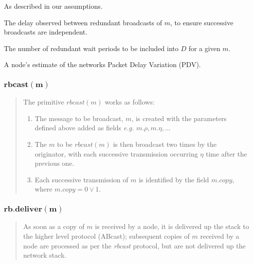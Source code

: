     \begin{description}[leftmargin=1cm, labelindent=1cm]
        \item[$\bm{x_{mx}}$ \textnormal{and}  $\bm{q}$ - ]    As described in our assumptions.
        
        \item[$\bm{\eta}$ - ]    The delay observed between redundant broadcasts of $m$, to ensure successive broadcasts are independent.  

        \item[$\bm{\rho}$ - ]    The number of redundant wait periods to be included into $D$ for a given $m$.        
        
        \item[$\bm{\omega}$ - ]    A node's estimate of the networks Packet Delay Variation (PDV).  
        \end{description}
    
    \subsubsection*{$\bm{rbcast(m)}$}
    \begin{quotation}
    \noindent The primitive $rbcast(m)$ works as follows:
    \begin{enumerate}[label=\roman*]
        \item    The message to be broadcast, $m$, is created with the parameters defined above added as fields \emph{e.g.} $m.\rho, m.\eta, \ldots$ 
        
        \item    The $m$ to be $rbcast(m)$ is then broadcast two times by the originator, with each successive transmission occurring $\eta$ time after the previous one.  
        
        \item    Each successive transmission of $m$ is identified by the field $m.copy$, where $m.copy = 0 \lor 1$.  
    \end{enumerate}
        \end{quotation}

    
     \subsubsection*{$\bm{rb.deliver(m)}$}
	     \begin{quotation}
	     As soon as a copy of $m$ is received by a node, it is delivered up the stack to the higher level protocol (\textsf{ABcast}); subsequent copies of $m$ received by a node are processed as per the \emph{rbcast} protocol, but are not delivered up the network stack.  
	     \end{quotation}
	         
